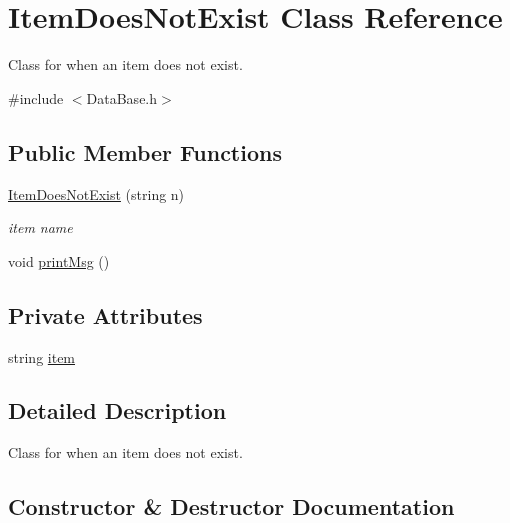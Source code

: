 \hypertarget{classItemDoesNotExist}{}\section{Item\+Does\+Not\+Exist Class Reference}
\label{classItemDoesNotExist}


Class for when an item does not exist.  




{\ttfamily \#include $<$Data\+Base.\+h$>$}

\subsection*{Public Member Functions}
\begin{DoxyCompactItemize}
\item 
\hyperlink{classItemDoesNotExist_aa5e1ee7b9ba756f3f69643ccc956877f}{Item\+Does\+Not\+Exist} (string n)
\begin{DoxyCompactList}\small\item\em item name \end{DoxyCompactList}\item 
void \hyperlink{classItemDoesNotExist_ac043ce235a565e8766cf55b32a2aa80c}{print\+Msg} ()
\end{DoxyCompactItemize}
\subsection*{Private Attributes}
\begin{DoxyCompactItemize}
\item 
string \hyperlink{classItemDoesNotExist_ac1848f31f6668f41a166b4976189ec0f}{item}
\end{DoxyCompactItemize}


\subsection{Detailed Description}
Class for when an item does not exist. 

\subsection{Constructor \& Destructor Documentation}
\mbox{\label{classItemDoesNotExist_aa5e1ee7b9ba756f3f69643ccc956877f}} 
